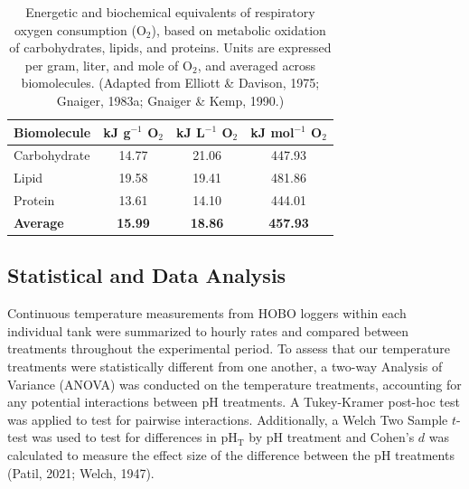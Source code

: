 \documentclass{CSUNthesis}
\begin{document}
\begin{table}[H]
\captionsetup{width=\textwidth}
\centering
\caption[Energetic and biochemical equivalents of respiratory oxygen consumption.]{Energetic and biochemical equivalents of respiratory oxygen consumption (O$_2$), based on metabolic oxidation of carbohydrates, lipids, and proteins. Units are expressed per gram, liter, and mole of O$_2$, and averaged across biomolecules. (Adapted from Elliott \& Davison, 1975; Gnaiger, 1983a; Gnaiger \& Kemp, 1990.)}
\vspace{0.5em}
\begin{tabular}{lccc}
\toprule
\textbf{Biomolecule} & \textbf{kJ g$^{-1}$ O$_2$} & \textbf{kJ L$^{-1}$ O$_2$} & \textbf{kJ mol$^{-1}$ O$_2$} \\
\midrule
Carbohydrate         & 14.77                     & 21.06                      & 447.93                       \\
Lipid                & 19.58                     & 19.41                      & 481.86                       \\
Protein              & 13.61                     & 14.10                      & 444.01                       \\
\textbf{Average}     & \textbf{15.99}            & \textbf{18.86}             & \textbf{457.93}              \\
\bottomrule
\end{tabular}
\label{tab:oxygen_consumption_table}
\end{table}

\subsection*{Statistical and Data Analysis}\label{statistical-and-data-analysis}

Continuous temperature measurements from HOBO loggers within each individual tank were summarized to hourly rates and compared between treatments throughout the experimental period. To assess that our temperature treatments were statistically different from one another, a two-way Analysis of Variance (ANOVA) was conducted on the temperature treatments, accounting for any potential interactions between pH treatments. A Tukey-Kramer post-hoc test was applied to test for pairwise interactions. Additionally, a Welch Two Sample \(t\)-test was used to test for differences in pH\(_\mathrm{T}\) by pH treatment and Cohen's \(d\) was calculated to measure the effect size of the difference between the pH treatments (Patil, 2021; Welch, 1947).
\end{document}
